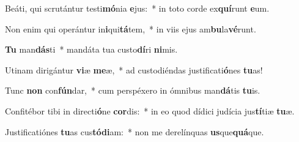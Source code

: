 \item Beáti, qui scrutántur testi\textbf{mó}nia \textbf{e}jus:~* in toto corde ex\textbf{quí}runt \textbf{e}um.
\item Non enim qui operántur in\textbf{i}qui\textbf{tá}tem,~* in viis ejus am\textbf{bu}la\textbf{vé}runt.
\item \textbf{Tu} man\textbf{dás}ti~* mandáta tua custo\textbf{dí}ri \textbf{ni}mis.
\item Utinam dirigántur \textbf{vi}æ \textbf{me}æ,~* ad custodiéndas justificati\textbf{ó}nes \textbf{tu}as!
\item Tunc \textbf{non} con\textbf{fún}dar,~* cum perspéxero in ómnibus man\textbf{dá}tis \textbf{tu}is.
\item Confitébor tibi in directi\textbf{ó}ne \textbf{cor}dis:~* in eo quod dídici judícia jus\textbf{tí}tiæ \textbf{tu}æ.
\item Justificatiónes \textbf{tu}as cus\textbf{tó}\textbf{di}am:~* non me derelínquas \textbf{us}que\textbf{quá}que.
